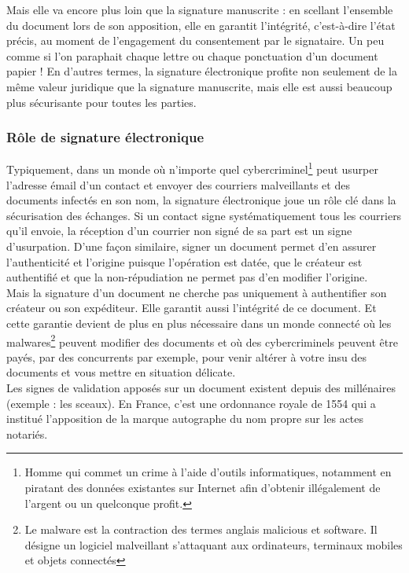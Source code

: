                 Mais elle va encore plus loin que la signature manuscrite : en scellant l’ensemble du document lors de son apposition, elle en garantit l’intégrité, c’est-à-dire l’état précis, au moment de l’engagement du consentement par le signataire. Un peu comme si l’on paraphait chaque lettre ou chaque ponctuation d’un document papier ! En d’autres termes, la signature électronique profite non seulement de la même valeur juridique que la signature manuscrite, mais elle est aussi beaucoup plus sécurisante pour toutes les parties.
                
            
			    
			    
			    
			    
			\subsubsection{Rôle de signature électronique}
			    Typiquement, dans un monde où n’importe quel cybercriminel\footnote{Homme qui commet un crime à l'aide d'outils informatiques, notamment en piratant des données existantes sur Internet afin d'obtenir illégalement de l'argent ou un quelconque profit.} peut usurper l’adresse émail d’un contact et envoyer des courriers malveillants et des documents infectés en son nom, la signature électronique joue un rôle clé dans la sécurisation des échanges. Si un contact signe systématiquement tous les courriers qu’il envoie, la réception d’un courrier non signé de sa part est un signe d’usurpation. D’une façon similaire, signer un document permet d’en assurer l’authenticité et l’origine puisque l’opération est datée, que le créateur est authentifié et que la non-répudiation ne permet pas d’en modifier l’origine.\\

                Mais la signature d’un document ne cherche pas uniquement à authentifier son créateur ou son expéditeur. Elle garantit aussi l’intégrité de ce document. Et cette garantie devient de plus en plus nécessaire dans un monde connecté où les malwares\footnote{Le malware est la contraction des termes anglais malicious et software. Il désigne un logiciel malveillant s'attaquant aux ordinateurs, terminaux mobiles et objets connectés} peuvent modifier des documents et où des cybercriminels peuvent être payés, par des concurrents par exemple, pour venir altérer à votre insu des documents et vous mettre en situation délicate.\\
                Les signes de validation apposés sur un document existent depuis des millénaires (exemple : les sceaux). En France, c’est une ordonnance royale de 1554 qui a institué l'apposition de la marque autographe du nom propre sur les actes notariés\cite{signrole}.\\
                
